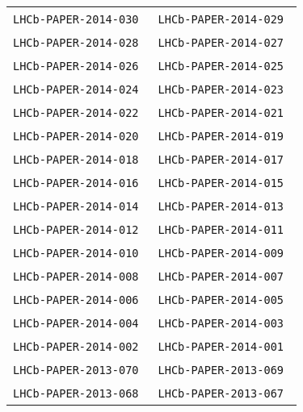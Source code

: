 \begin{center}
\begin{longtable}{ll}
\texttt{LHCb-PAPER-2014-030}~\cite{LHCb-PAPER-2014-030} &
\texttt{LHCb-PAPER-2014-029}~\cite{LHCb-PAPER-2014-029} \\
\texttt{LHCb-PAPER-2014-028}~\cite{LHCb-PAPER-2014-028} &
\texttt{LHCb-PAPER-2014-027}~\cite{LHCb-PAPER-2014-027} \\
\texttt{LHCb-PAPER-2014-026}~\cite{LHCb-PAPER-2014-026} &
\texttt{LHCb-PAPER-2014-025}~\cite{LHCb-PAPER-2014-025} \\
\texttt{LHCb-PAPER-2014-024}~\cite{LHCb-PAPER-2014-024} &
\texttt{LHCb-PAPER-2014-023}~\cite{LHCb-PAPER-2014-023} \\
\texttt{LHCb-PAPER-2014-022}~\cite{LHCb-PAPER-2014-022} &
\texttt{LHCb-PAPER-2014-021}~\cite{LHCb-PAPER-2014-021} \\
\texttt{LHCb-PAPER-2014-020}~\cite{LHCb-PAPER-2014-020} &
\texttt{LHCb-PAPER-2014-019}~\cite{LHCb-PAPER-2014-019} \\
\texttt{LHCb-PAPER-2014-018}~\cite{LHCb-PAPER-2014-018} &
\texttt{LHCb-PAPER-2014-017}~\cite{LHCb-PAPER-2014-017} \\
\texttt{LHCb-PAPER-2014-016}~\cite{LHCb-PAPER-2014-016} &
\texttt{LHCb-PAPER-2014-015}~\cite{LHCb-PAPER-2014-015} \\
\texttt{LHCb-PAPER-2014-014}~\cite{LHCb-PAPER-2014-014} &
\texttt{LHCb-PAPER-2014-013}~\cite{LHCb-PAPER-2014-013} \\
\texttt{LHCb-PAPER-2014-012}~\cite{LHCb-PAPER-2014-012} &
\texttt{LHCb-PAPER-2014-011}~\cite{LHCb-PAPER-2014-011} \\
\texttt{LHCb-PAPER-2014-010}~\cite{LHCb-PAPER-2014-010} &
\texttt{LHCb-PAPER-2014-009}~\cite{LHCb-PAPER-2014-009} \\
\texttt{LHCb-PAPER-2014-008}~\cite{LHCb-PAPER-2014-008} &
\texttt{LHCb-PAPER-2014-007}~\cite{LHCb-PAPER-2014-007} \\
\texttt{LHCb-PAPER-2014-006}~\cite{LHCb-PAPER-2014-006} &
\texttt{LHCb-PAPER-2014-005}~\cite{LHCb-PAPER-2014-005} \\
\texttt{LHCb-PAPER-2014-004}~\cite{LHCb-PAPER-2014-004} &
\texttt{LHCb-PAPER-2014-003}~\cite{LHCb-PAPER-2014-003} \\
\texttt{LHCb-PAPER-2014-002}~\cite{LHCb-PAPER-2014-002} &
\texttt{LHCb-PAPER-2014-001}~\cite{LHCb-PAPER-2014-001} \\
\hline
\texttt{LHCb-PAPER-2013-070}~\cite{LHCb-PAPER-2013-070} &
\texttt{LHCb-PAPER-2013-069}~\cite{LHCb-PAPER-2013-069} \\
\texttt{LHCb-PAPER-2013-068}~\cite{LHCb-PAPER-2013-068} &
\texttt{LHCb-PAPER-2013-067}~\cite{LHCb-PAPER-2013-067} \\

\end{longtable}
\end{center}
